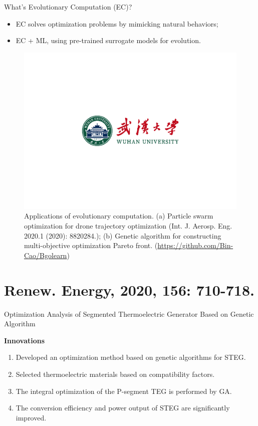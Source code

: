 \documentclass{beamer}
\begin{document}
\begin{frame}{What's Evolutionary Computation (EC)?}
    \small
	\begin{itemize}
		\item {
			EC solves optimization problems by mimicking natural behaviors;
		}
		\item {
			EC + ML, using pre-trained surrogate models for evolution.
		}
	\end{itemize}

	\begin{figure}
		\centering
		\includegraphics[scale=0.20]{pic/dark.pdf}
		\caption{Applications of evolutionary computation. (a) Particle swarm optimization for drone trajectory optimization (Int. J. Aerosp. Eng. 2020.1 (2020): 8820284.); (b) Genetic algorithm for constructing multi-objective optimization Pareto front. (\url{https://github.com/Bin-Cao/Bgolearn})}
		\label{fig3}
	\end{figure}
\end{frame}


\section{Renew. Energy, 2020, 156: 710-718.}

\begin{frame}{Optimization Analysis of Segmented Thermoelectric Generator Based on Genetic Algorithm}
	\begin{block}{\textbf{Innovations}}
		\begin{enumerate}
			\item Developed an optimization method based on genetic algorithms for STEG.
			\item Selected thermoelectric materials based on compatibility factors.
			\item The integral optimization of the P-segment TEG is performed by GA.
			\item The conversion efficiency and power output of STEG are significantly improved.
		\end{enumerate}
	\end{block}
\end{frame}
\end{document}
